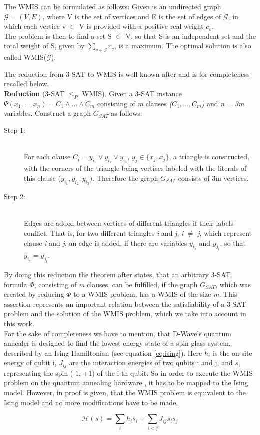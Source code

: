 The WMIS can be formulated as follows: Given is an undirected graph $\mathcal{G} = (V, E)$, where V is the set of vertices and E is the set of edges of $\mathcal{G}$, in which each vertice v $\in$ V is provided with a positive real weight $c_{v}$.\\
The problem is then to find a set S $\subset$ V, so that S is an independent set and the total weight of S, given by $\sum_{v \in S} c_{v}$, is a maximum. The optimal solution is also called WMIS($\mathcal{G}$).

The reduction from 3-SAT to WMIS is well known after \cite{choi2010adiabatic} and is for completeness recalled below.\\

\textbf{Reduction} (3-SAT $\leq_ {P}$ WMIS).
Given a 3-SAT instance $\Psi(x_{1}, \dots, x_{n}) = C_{1} \wedge ... \wedge C_{m}$ consisting of \emph{m} clauses \emph{($C_{1}, ..., C_{m}$)} and \emph{n = 3m} variables. Construct a graph $G_{SAT}$ as follows:
\begin{description}
	\item[Step 1:]\hfill \\
	For each clause $C_{i} = y_{i_{1}} \vee y_{i_{2}} \vee y_{i_{3}}$, $y_{j} \in \{x_{j}, \overline{x_{j}}\}$, a triangle is constructed, with the corners of the triangle being vertices labeled with the literals of this clause ($y_{i_{1}}, y_{i_{2}}, y_{i_{3}})$. Therefore the graph $G_{SAT}$ consists of 3m vertices.
	\item[Step 2:]\hfill \\
	Edges are added between vertices of different triangles if their labels conflict. That is, for two different triangles \emph{i} and \emph{j}, \emph{i} $\neq$ \emph{j}, which represent clause \emph{i} and \emph{j}, an edge is added, if there are variables $y_{i_{s}}$ and $y_{j_{t}}$, so that $y_{i_{s}} = \overline{y_{j_{t}}}$.
\end{description}

By doing this reduction the theorem after \cite{choi2010adiabatic} states, that an arbitrary 3-SAT formula $\Phi$, consisting of \emph{m} clauses, can be fulfilled, if the graph $G_{SAT}$, which was created by reducing $\Phi$ to a WMIS problem, has a WMIS of the size \emph{m}. 
This assertion represents an important relation between the satisfiability of a 3-SAT problem and the solution of the WMIS problem, which we take into account in this work.\\

For the sake of completeness we have to mention, that D-Wave's quantum annealer is designed to find the lowest energy state of a spin glass system, described by an Ising Hamiltonian (see equation \ref{eq:ising}). Here $ h_{i}$ is the on-site energy of qubit i, $J_{ij}$ are the interaction energies of two qubits i and j, and $s_{i}$ representing the spin (-1, +1) of the i-th qubit. So in order to execute the WMIS problem on the quantum annealing hardware , it has to be mapped to the Ising model. However, in \cite{choi2008minor} proof is given, that the WMIS problem is equivalent to the Ising model and no more modifications have to be made.

\begin{equation}\label{eq:ising}
	\mathcal{H}(s) = \sum_{i} h_{i}s_{i} + \sum_{i<j} J_{ij}s_{i}s_{j}
\end{equation}


